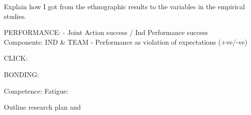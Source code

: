 Explain how I got from the ethnographic results to the variables in the empirical studies.

PERFORMANCE:
- Joint Action success / Ind Performance success
      Components: IND & TEAM
- Performance as violation of expectations (+ve/-ve)

CLICK:

BONDING:

Competence:
Fatigue:


Outline research plan and 
